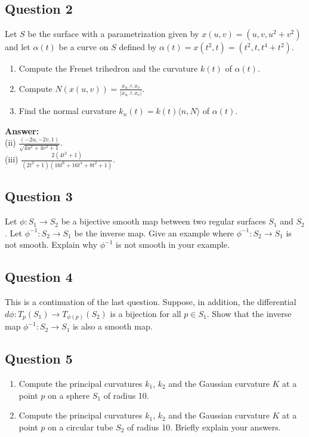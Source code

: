 \documentclass[12pt, a4paper]{article}
\newcommand{\inner}[1]{\langle #1 \rangle}
\begin{document}
\subsection*{Question 2}
Let $S$ be the surface with a parametrization given by $x(u,v)=(u,v,u^{2}+v^{2})$ and let $\alpha(t)$ be a curve on $S$ defined by $\alpha(t)=x(t^{2},t)=(t^{2},t,t^{4}+t^{2})$.
\begin{enumerate}[label=(\roman*)]
    \item Compute the Frenet trihedron and the curvature $k(t)$ of $\alpha(t)$.
    \item Compute $N(x(u,v))=\frac{x_{u}\wedge x_{v}}{|x_{u}\wedge x_{v}|}$.
    \item Find the normal curvature $k_{n}(t)=k(t)\inner{n,N}$ of $\alpha(t)$.
\end{enumerate}
\vspace{1em}
\noindent\textbf{Answer:}\\
(ii) $\frac{(-2u,-2v,1)}{\sqrt{4u^{2}+4v^{2}+1}}$.\\
(iii) $\frac{2(4t^{2}+1)}{(2t^{2}+1)(16t^{6}+16t^{4}+8t^{2}+1)}$.
\newpage

\subsection*{Question 3}
Let $\phi:S_{1}\rightarrow S_{2}$ be a bijective smooth map between two regular surfaces $S_{1}$ and $S_{2}$. Let $\phi^{-1}:S_{2}\rightarrow S_{1}$ be the inverse map. Give an example where $\phi^{-1}:S_{2}\rightarrow S_{1}$ is not smooth. Explain why $\phi^{-1}$ is not smooth in your example.
\newpage

\subsection*{Question 4}
This is a continuation of the last question. Suppose, in addition, the differential $d\phi:T_{p}(S_{1})\rightarrow T_{\phi(p)}(S_{2})$ is a bijection for all $p\in S_{1}$. Show that the inverse map $\phi^{-1}: S_{2}\rightarrow S_{1}$ is also a smooth map.
\newpage

\subsection*{Question 5}
\begin{enumerate}[label=(\roman*)]
    \item Compute the principal curvatures $k_{1}$, $k_{2}$ and the Gaussian curvature $K$ at a point $p$ on a sphere $S_{1}$ of radius 10.
    \item Compute the principal curvatures $k_{1}$, $k_{2}$ and the Gaussian curvature $K$ at a point $p$ on a circular tube $S_{2}$ of radius 10. Briefly explain your answers.
\end{enumerate}
\newpage
\end{document}
